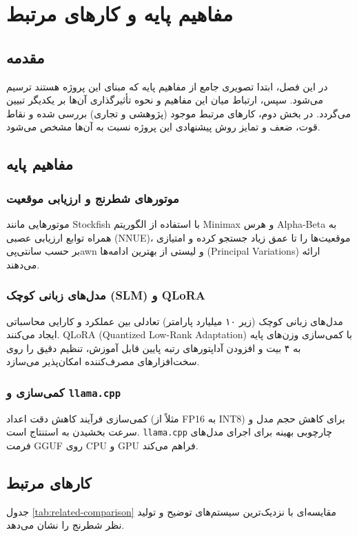 \documentclass[a4paper,12pt]{report}
\begin{document}
\chapter{مفاهیم پایه و کارهای مرتبط}
\section{مقدمه}
در این فصل، ابتدا تصویری جامع از مفاهیم پایه که مبنای این پروژه هستند ترسیم می‌شود. سپس، ارتباط میان این مفاهیم و نحوه تأثیرگذاری آن‌ها بر یکدیگر تبیین می‌گردد. در بخش دوم، کارهای مرتبط موجود (پژوهشی و تجاری) بررسی شده و نقاط قوت، ضعف و تمایز روش پیشنهادی این پروژه نسبت به آن‌ها مشخص می‌شود.

\section{مفاهیم پایه}
\subsection{موتورهای شطرنج و ارزیابی موقعیت}
موتورهایی مانند Stockfish با استفاده از الگوریتم Minimax و هرس Alpha-Beta به همراه توابع ارزیابی عصبی (NNUE)، موقعیت‌ها را تا عمق زیاد جستجو کرده و امتیازی بر حسب سانتی‌پیawn و لیستی از بهترین ادامه‌ها (Principal Variations) ارائه می‌دهند.

\subsection{مدل‌های زبانی کوچک (SLM) و QLoRA}
مدل‌های زبانی کوچک (زیر ۱۰ میلیارد پارامتر) تعادلی بین عملکرد و کارایی محاسباتی ایجاد می‌کنند. QLoRA (Quantized Low-Rank Adaptation) با کمی‌سازی وزن‌های پایه به ۴ بیت و افزودن آداپتورهای رتبه پایین قابل آموزش، تنظیم دقیق را روی سخت‌افزارهای مصرف‌کننده امکان‌پذیر می‌سازد.

\subsection{کمی‌سازی و \texttt{llama.cpp}}
کمی‌سازی فرآیند کاهش دقت اعداد (مثلاً از FP16 به INT8) برای کاهش حجم مدل و سرعت بخشیدن به استنتاج است. \texttt{llama.cpp} چارچوبی بهینه برای اجرای مدل‌های فرمت GGUF روی CPU و GPU فراهم می‌کند.

\section{کارهای مرتبط}
جدول \ref{tab:related-comparison} مقایسه‌ای با نزدیک‌ترین سیستم‌های توضیح و تولید نظر شطرنج را نشان می‌دهد.
\end{document}
